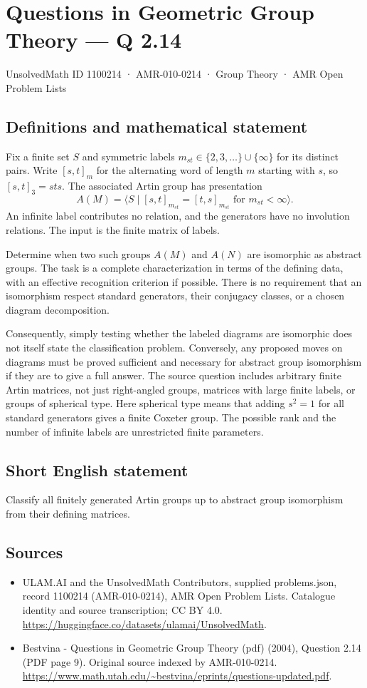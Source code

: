 \documentclass[11pt,a4paper]{article}
\begin{document}
\section*{Questions in Geometric Group Theory — Q 2.14}\label{1100214}
{\small UnsolvedMath ID 1100214 · AMR-010-0214 · Group Theory · AMR Open Problem Lists}
\subsection{Definitions and mathematical statement}
Fix a finite set $S$ and symmetric labels $m_{st}\in\{2,3,\ldots\}\cup\{\infty\}$ for its distinct pairs. Write $[s,t]_m$ for the alternating word of length $m$ starting with $s$, so $[s,t]_3=sts$. The associated Artin group has presentation
\[
 A(M)=\langle S\mid [s,t]_{m_{st}}=[t,s]_{m_{st}}
                      \text{ for }m_{st}<\infty\rangle.
\]
An infinite label contributes no relation, and the generators have no involution relations. The input is the finite matrix of labels.

Determine when two such groups $A(M)$ and $A(N)$ are isomorphic as abstract groups. The task is a complete characterization in terms of the defining data, with an effective recognition criterion if possible. There is no requirement that an isomorphism respect standard generators, their conjugacy classes, or a chosen diagram decomposition.

Consequently, simply testing whether the labeled diagrams are isomorphic does not itself state the classification problem. Conversely, any proposed moves on diagrams must be proved sufficient and necessary for abstract group isomorphism if they are to give a full answer. The source question includes arbitrary finite Artin matrices, not just right-angled groups, matrices with large finite labels, or groups of spherical type. Here spherical type means that adding $s^2=1$ for all standard generators gives a finite Coxeter group. The possible rank and the number of infinite labels are unrestricted finite parameters.
\subsection{Short English statement}
Classify all finitely generated Artin groups up to abstract group isomorphism from their defining matrices.
\subsection{Sources}
\begin{itemize}
\item[S1] ULAM.AI and the UnsolvedMath Contributors, supplied problems.json, record 1100214 (AMR-010-0214), AMR Open Problem Lists. Catalogue identity and source transcription; CC BY 4.0.
\url{https://huggingface.co/datasets/ulamai/UnsolvedMath}.
\item[S2] Bestvina - Questions in Geometric Group Theory (pdf) (2004), Question 2.14 (PDF page 9). Original source indexed by AMR-010-0214.
\url{https://www.math.utah.edu/~bestvina/eprints/questions-updated.pdf}.
\end{itemize}
\end{document}
